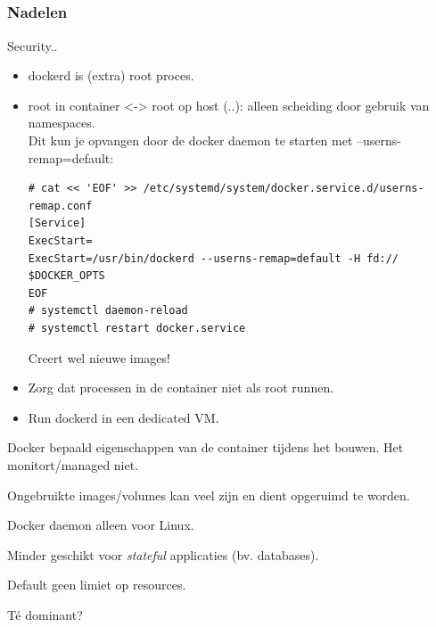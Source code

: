 \subsection{}
\begin{styleframefrag}
    \frametitle{Nadelen}
\pause
\scriptsize
\begin{description}[plus]
    \item[-] Security..
		\pause
		\begin{itemize}
			\item dockerd is (extra) root proces.
			\item root in container <-> root op host (..): alleen scheiding door gebruik van namespaces.\\
\pause
Dit kun je opvangen door de docker daemon te starten met --userns-remap=default:
\begin{verbatim}
# cat << 'EOF' >> /etc/systemd/system/docker.service.d/userns-remap.conf
[Service]
ExecStart=
ExecStart=/usr/bin/dockerd --userns-remap=default -H fd:// $DOCKER_OPTS
EOF
# systemctl daemon-reload
# systemctl restart docker.service
\end{verbatim}
			\pause Creert wel nieuwe images!
			\pause
			\item Zorg dat processen in de container niet als root runnen.
			\pause
			\item Run dockerd in een dedicated VM.
		\end{itemize}
    \pause
    \item[-] Docker bepaald eigenschappen van de container tijdens het bouwen. Het monitort/managed niet.
    \pause
    \item[-] Ongebruikte images/volumes kan veel zijn en dient opgeruimd te worden.
    \pause
    \item[-] Docker daemon alleen voor Linux.
    \pause
    \item[-] Minder geschikt voor {\it stateful} applicaties (bv. databases).
    \pause
    \item[-] Default geen limiet op resources.
    \pause
    \item[-] T\'{e} dominant?
\end{description}
\end{styleframefrag}

